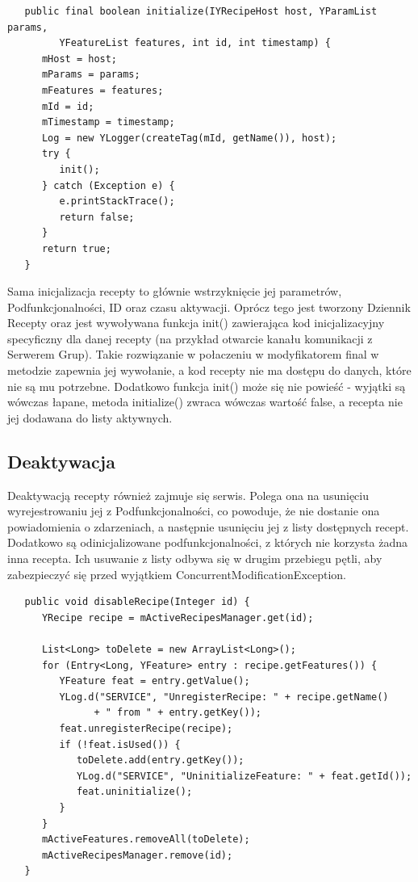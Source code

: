 \documentclass[11pt,a4paper,polish,thesis]{dcsbook}
\begin{document}
\begin{verbatim}
   public final boolean initialize(IYRecipeHost host, YParamList params,
         YFeatureList features, int id, int timestamp) {
      mHost = host;
      mParams = params;
      mFeatures = features;
      mId = id;
      mTimestamp = timestamp;
      Log = new YLogger(createTag(mId, getName()), host);
      try {
         init();
      } catch (Exception e) {
         e.printStackTrace();
         return false;
      }
      return true;
   }
\end{verbatim}

Sama inicjalizacja recepty to głównie wstrzyknięcie jej parametrów, Podfunkcjonalności, ID oraz czasu aktywacji. Oprócz tego jest tworzony Dziennik Recepty oraz jest wywoływana funkcja init() zawierająca kod inicjalizacyjny specyficzny dla danej recepty (na przykład otwarcie kanału komunikacji z Serwerem Grup). Takie rozwiązanie w połaczeniu w modyfikatorem final w metodzie zapewnia jej wywołanie, a kod recepty nie ma dostępu do danych, które nie są mu potrzebne. Dodatkowo funkcja init() może się nie powieść - wyjątki są wówczas łapane, metoda initialize() zwraca wówczas wartość false, a recepta nie jej dodawana do listy aktywnych.
\subsection{Deaktywacja}
Deaktywacją recepty również zajmuje się serwis. Polega ona na usunięciu wyrejestrowaniu jej z Podfunkcjonalności, co powoduje, że nie dostanie ona powiadomienia o zdarzeniach, a następnie usunięciu jej z listy dostępnych recept. Dodatkowo są odinicjalizowane podfunkcjonalności, z których nie korzysta żadna inna recepta. Ich usuwanie z listy odbywa się w drugim przebiegu pętli, aby zabezpieczyć się przed wyjątkiem ConcurrentModificationException.
\begin{verbatim}
   public void disableRecipe(Integer id) {
      YRecipe recipe = mActiveRecipesManager.get(id);
      
      List<Long> toDelete = new ArrayList<Long>();
      for (Entry<Long, YFeature> entry : recipe.getFeatures()) {
         YFeature feat = entry.getValue();
         YLog.d("SERVICE", "UnregisterRecipe: " + recipe.getName()
               + " from " + entry.getKey());
         feat.unregisterRecipe(recipe);
         if (!feat.isUsed()) {
            toDelete.add(entry.getKey());
            YLog.d("SERVICE", "UninitializeFeature: " + feat.getId());
            feat.uninitialize();
         }
      }
      mActiveFeatures.removeAll(toDelete);
      mActiveRecipesManager.remove(id);
   }
\end{verbatim}
\end{document}

